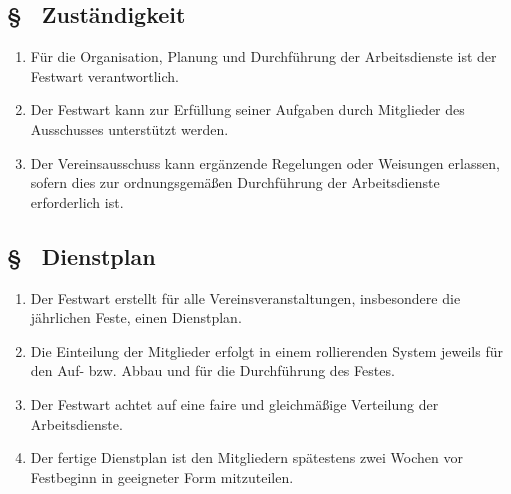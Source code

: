 \subsection{§ \theaoparagraphcounter\ Zuständigkeit} \label{ao:par:zustaendigkeit}
\begin{enumerate}
    \item \label{ao:abs:de9f3d} Für die Organisation, Planung und Durchführung der Arbeitsdienste ist der Festwart verantwortlich.

    \item \label{ao:abs:akpmko} Der Festwart kann zur Erfüllung seiner Aufgaben durch Mitglieder des Ausschusses unterstützt werden.

    \item \label{ao:abs:g6e0kq} Der Vereinsausschuss kann ergänzende Regelungen oder Weisungen erlassen, sofern dies zur ordnungsgemäßen Durchführung der Arbeitsdienste erforderlich ist.
\end{enumerate}

\subsection{§ \theaoparagraphcounter\ Dienstplan} \label{ao:par:dienstplan}
\begin{enumerate}
    \item \label{ao:abs:k4euy7} Der Festwart erstellt für alle Vereinsveranstaltungen, insbesondere die jährlichen Feste, einen Dienstplan.

    \item \label{ao:abs:x8y3us} Die Einteilung der Mitglieder erfolgt in einem rollierenden System jeweils für den Auf- bzw. Abbau und für die Durchführung des Festes.

    \item \label{ao:abs:u14cg3} Der Festwart achtet auf eine faire und gleichmäßige Verteilung der Arbeitsdienste.

    \item \label{ao:abs:mcswfh} Der fertige Dienstplan ist den Mitgliedern spätestens zwei Wochen vor Festbeginn in geeigneter Form mitzuteilen.
\end{enumerate}

